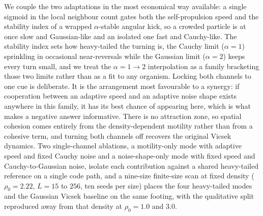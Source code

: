 \documentclass[11pt,a4paper]{article}
\begin{document}
We couple the two adaptations in the most economical way
available: a single sigmoid in the local neighbour count gates
both the self-propulsion speed and the stability index of a
wrapped $\alpha$-stable angular kick, so a crowded particle is at
once slow and Gaussian-like and an isolated one fast and
Cauchy-like. The stability index sets how heavy-tailed the
turning is, the Cauchy limit ($\alpha = 1$) sprinkling in
occasional near-reversals while the Gaussian limit ($\alpha = 2$)
keeps every turn small, and we treat the $\alpha = 1 \to 2$
interpolation as a family bracketing those two limits rather than
as a fit to any organism. Locking both channels to one cue is
deliberate. It is the arrangement most favourable to a synergy:
if cooperation between an adaptive speed and an adaptive noise
shape exists anywhere in this family, it has its best chance of
appearing here, which is what makes a negative answer
informative. There is no attraction zone, so spatial cohesion
comes entirely from the density-dependent motility rather than
from a cohesive term, and turning both channels off recovers the
original Vicsek dynamics. Two single-channel ablations, a
motility-only mode with adaptive speed and fixed Cauchy noise and
a noise-shape-only mode with fixed speed and Cauchy-to-Gaussian
noise, isolate each contribution against a shared heavy-tailed
reference on a single code path, and a nine-size finite-size scan
at fixed density ($\rho_0 = 2.22$, $L = 15$ to $256$, ten seeds
per size) places the four heavy-tailed modes and the Gaussian
Vicsek baseline on the same footing, with the qualitative split
reproduced away from that density at $\rho_0 = 1.0$ and $3.0$.
\end{document}
